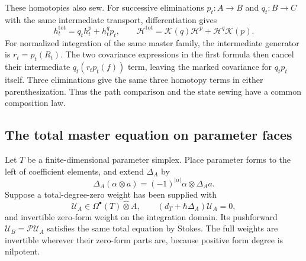 These homotopies also sew. For successive eliminations
$p_t:A\to B$ and $q_t:B\to C$ with the same intermediate
transport, differentiation gives
\begin{equation}\label{eq:vol2-gauge-homotopy-sewing}
 h_t^{\mathrm{tot}}=q_th_t^p+h_t^qp_t,
 \qquad
 \mathcal H^{\mathrm{tot}}
    =\mathscr K(q)\mathcal H^p
                         +\mathcal H^q\mathscr K(p).
\end{equation}
For normalized integration of the same master family,
the intermediate generator is $r_t=p_t(R_t)$.
The two covariance expressions in the first formula then
cancel their intermediate $q_t(r_tp_t(f))$ term, leaving
the marked covariance for $q_tp_t$ itself.
Three eliminations give the same three homotopy terms
in either parenthesization. Thus the path comparison
and the state sewing have a common composition law.

\subsection{The total master equation on parameter faces}

Let $T$ be a finite-dimensional parameter simplex.
Place parameter forms to the left of coefficient
elements, and extend $\Delta_A$ by
\[
 \Delta_A(\alpha\otimes a)
            =(-1)^{|\alpha|}\alpha\otimes\Delta_Aa.
\]
Suppose a total-degree-zero weight has been supplied with
\begin{equation}\label{eq:vol2-total-master-weight}
 \mathcal U_A\in\Omega^\bullet(T)\widehat\otimes A,
 \qquad(d_T+\hbar\Delta_A)\mathcal U_A=0,
\end{equation}
and invertible zero-form weight on the integration domain.
Its pushforward $\mathcal U_B=\mathcal P\mathcal U_A$
satisfies the same total equation by Stokes. The full
weights are invertible wherever their zero-form parts
are, because positive form degree is nilpotent.

